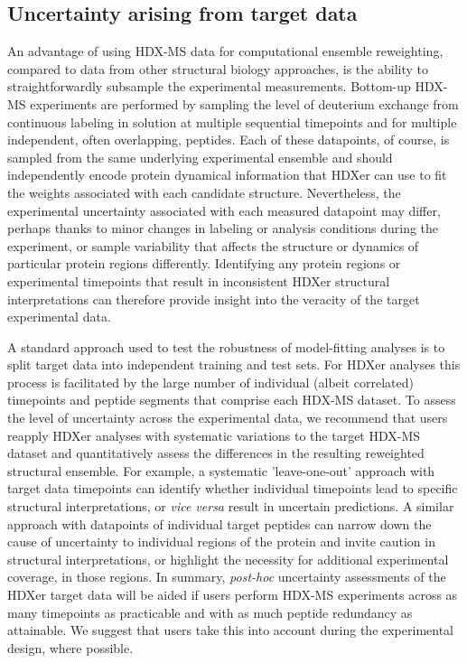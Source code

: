 \documentclass[9pt,tutorial,ASAPversion]{livecoms}
\begin{document}
\subsection{Uncertainty arising from target data}\label{target_data_uncertainty_sect}
An advantage of using HDX-MS data for computational ensemble reweighting, compared to data from other structural biology approaches, is the ability to straightforwardly subsample the experimental measurements.
Bottom-up HDX-MS experiments are performed by sampling the level of deuterium exchange from continuous labeling in solution at multiple sequential timepoints and for multiple independent, often overlapping, peptides.
Each of these datapoints, of course, is sampled from the same underlying experimental ensemble and should independently encode protein dynamical information that HDXer can use to fit the weights associated with each candidate structure.
Nevertheless, the experimental uncertainty associated with each measured datapoint may differ, perhaps thanks to minor changes in labeling or analysis conditions during the experiment, or sample variability that affects the structure or dynamics of particular protein regions differently.
Identifying any protein regions or experimental timepoints that result in inconsistent HDXer structural interpretations can therefore provide insight into the veracity of the target experimental data.

A standard approach used to test the robustness of model-fitting analyses is to split target data into independent training and test sets.
For HDXer analyses this process is facilitated by the large number of individual (albeit correlated) timepoints and peptide segments that comprise each HDX-MS dataset.
To assess the level of uncertainty across the experimental data, we recommend that users reapply HDXer analyses with systematic variations to the target HDX-MS dataset and quantitatively assess the differences in the resulting reweighted structural ensemble. 
For example, a systematic 'leave-one-out' approach with target data timepoints can identify whether individual timepoints lead to specific structural interpretations, or \textit{vice versa} result in uncertain predictions.
A similar approach with datapoints of individual target peptides can narrow down the cause of uncertainty to individual regions of the protein and invite caution in structural interpretations, or highlight the necessity for additional experimental coverage, in those regions.
In summary, \textit{post-hoc} uncertainty assessments of the HDXer target data will be aided if users perform HDX-MS experiments across as many timepoints as practicable and with as much peptide redundancy as attainable.
We suggest that users take this into account during the experimental design, where possible.
\end{document}
